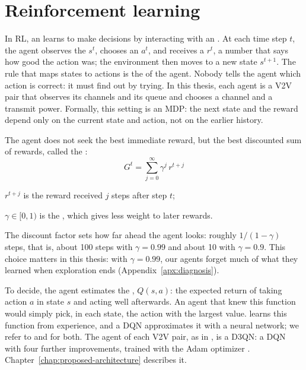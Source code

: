 \section{Reinforcement learning}
\label{sec:bg-rl}

In \ac{RL}, an  learns to make decisions by interacting with an 
\cite{sutton+18rl}. At each time step $t$, the agent observes the  $s^t$, chooses an
 $a^t$, and receives a  $r^t$, a number that says how good the action was;
the environment then moves to a new state $s^{t+1}$. The rule that maps states to actions is the
 of the agent. Nobody tells the agent which action is correct: it must find out by trying.
In this thesis, each agent is a \ac{V2V} pair that observes its channels and its queue and chooses a channel
and a transmit power. Formally, this setting is an \ac{MDP}: the next state and the reward depend only on
the current state and action, not on the earlier history.

The agent does not seek the best immediate reward, but the best discounted sum of rewards, called the
:
\begin{equation}
  G^t = \sum_{j=0}^{\infty} \gamma^{j}\, r^{t+j} \label{eq:bg-return}
\end{equation}
\begin{wherelist}
  \item $r^{t+j}$ is the reward received $j$ steps after step $t$;
  \item $\gamma \in [0, 1)$ is the , which gives less weight to later rewards.
\end{wherelist}
The discount factor sets how far ahead the agent looks: roughly $1/(1-\gamma)$ steps, that is, about 100
steps with $\gamma = 0.99$ and about 10 with $\gamma = 0.9$. This choice matters in this thesis: with
$\gamma = 0.99$, our agents forget much of what they learned when exploration ends
(Appendix~\ref{apx:diagnosis}).

To decide, the agent estimates the , $Q(s, a)$: the expected return of taking action $a$
in state $s$ and acting well afterwards. An agent that knew this function would simply pick, in each state,
the action with the largest value.  \cite{watkins+92qlearning} learns this function from
experience, and a \ac{DQN} \cite{mnih+15dqn} approximates it with a neural network; we refer to
\citet{sutton+18rl} and \citet{mnih+15dqn} for both. The agent of each \ac{V2V} pair, as in
\citet{li+22fedmarl}, is a \ac{D3QN}: a \ac{DQN} with four further improvements, trained with the Adam
optimizer \cite{kingma+15adam}. Chapter~\ref{chap:proposed-architecture} describes it.


